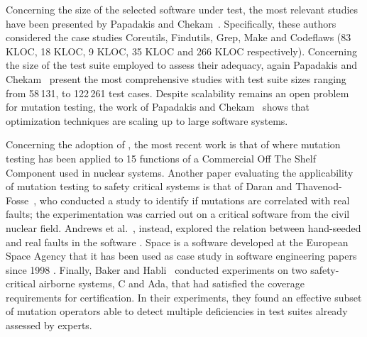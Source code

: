 Concerning the size of the selected software under test, the most relevant studies have been presented by Papadakis and Chekam~\cite{papadakis2018mutation,chekam2017empirical,papadakis2018mutant}. Specifically, these authors considered the case studies Coreutils, Findutils, Grep, Make and Codeflaws (83 KLOC, 18 KLOC, 9 KLOC, 35 KLOC and 266 KLOC respectively). 
Concerning the size of the test suite employed to assess their adequacy, again Papadakis and Chekam~\cite{papadakis2018mutation,chekam2017empirical,papadakis2018mutant} present the most comprehensive studies with test suite sizes ranging from 58\,131, to 122\,261 test cases.
Despite scalability remains an open problem for mutation testing, the work of Papadakis and Chekam~\cite{papadakis2018mutation,chekam2017empirical,papadakis2018mutant} shows that optimization techniques are scaling up to large software systems.

Concerning the adoption of , the most recent work is that of \cite{delgado2018evaluation} where mutation testing has been applied to 15 functions of a Commercial Off The Shelf Component used in nuclear systems. 
Another paper evaluating the applicability of mutation testing to safety critical systems is that of Daran and Thavenod-Fosse~\cite{daran1996software}, who conducted a study to identify if mutations are correlated with real faults; the experimentation was carried out on a critical software from the civil nuclear field. 
Andrews et al.~\cite{andrews2005mutation}, instead, explored the relation between hand-seeded and real faults in the software . Space is a software developed at the European Space Agency that it has been used as case study in software engineering papers since 1998 \cite{frankl1998further}.
Finally,  Baker and Habli~\cite{baker2012empirical} conducted experiments on two safety-critical airborne systems, C and Ada, that had satisfied the coverage requirements for certification. In their experiments, they found an effective subset of mutation operators able to detect multiple deficiencies in test suites already assessed by experts. 



